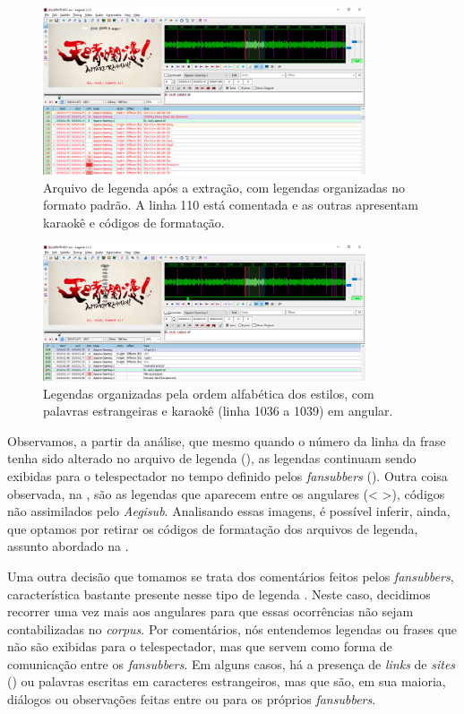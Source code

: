 \documentclass[portuguese]{textolivre}
\begin{document}
\begin{figure}[htbp]
 \centering
 \includegraphics[width=0.85\textwidth]{Fig14.png}
 \caption{Arquivo de legenda após a extração, com legendas organizadas no formato padrão. A linha 110 está comentada e as outras apresentam karaokê e códigos de formatação.}
 \label{fig14}
\end{figure}

\begin{figure}[htbp]
 \centering
 \includegraphics[width=0.85\textwidth]{Fig15.png}
 \caption{Legendas organizadas pela ordem alfabética dos estilos, com palavras estrangeiras e karaokê (linha 1036 a 1039) em angular.}
 \label{fig15}
\end{figure}

Observamos, a partir da análise, que mesmo quando o número da linha da frase tenha sido alterado no arquivo de legenda (), as legendas continuam sendo exibidas para o telespectador no tempo definido pelos \textit{fansubbers} (). Outra coisa observada, na , são as legendas que aparecem entre os angulares (< >), códigos não assimilados pelo \textit{Aegisub}. Analisando essas imagens, é possível inferir, ainda, que optamos por retirar os códigos de formatação dos arquivos de legenda, assunto abordado na .

Uma outra decisão que tomamos se trata dos comentários feitos pelos \textit{fansubbers}, característica bastante presente nesse tipo de legenda \cite{diaz-cintas_fansubs:_2006}. Neste caso, decidimos recorrer uma vez mais aos angulares para que essas ocorrências não sejam contabilizadas no \textit{corpus}. Por comentários, nós entendemos legendas ou frases que não são exibidas para o telespectador, mas que servem como forma de comunicação entre os \textit{fansubbers}. Em alguns casos, há a presença de \textit{links} de \textit{sites} () ou palavras escritas em caracteres estrangeiros, mas que são, em sua maioria, diálogos ou observações feitas entre ou para os próprios \textit{fansubbers}. 
\end{document}
